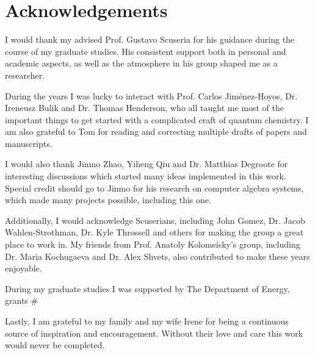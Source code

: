 \section*{Acknowledgements}

I would thank my advised Prof. Gustavo Scuseria for his guidance 
during the course of my graduate studies. His consistent support both in 
personal and academic aspects, as well as the atmosphere in his group shaped me 
as a researcher. 

During the years I was lucky to interact with Prof. Carlos 
Jim{\'e}nez-Hoyos, Dr. Ireneusz Bulik and Dr. Thomas Henderson,
who all taught me most of the important things to get started with a 
complicated craft of quantum chemistry. I am also grateful to Tom for reading 
and correcting multiple drafts of papers and manuscripts.

I would also thank Jinmo Zhao, Yiheng Qiu and Dr. Matthias Degroote for 
interesting discussions which started many ideas implemented in this work.
Special credit should go to Jinmo for his research on computer algebra 
systems, which made many projects possible, including this one.

Additionally, I would acknowledge Scuserians, including John Gomez, Dr. Jacob
Wahlen-Strothman, Dr. Kyle Throssell and others for making the group a great
place to work in. My friends from Prof. Anatoly Kolomeisky's group, including 
Dr. Maria Kochugaeva and Dr. Alex Shvets, also contributed to make these 
years enjoyable.

During my graduate studies I was supported by The Department of Energy, grants 
\# 

Lastly, I am grateful to my family and my wife Irene for being a 
continuous source of inspiration and encouragement. Without their love and 
care this work would never be completed.